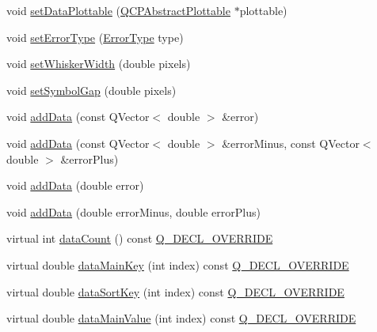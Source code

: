 \begin{DoxyCompactItemize}
\item 
void \mbox{\hyperlink{class_q_c_p_error_bars_aabb42a964cfbf780cd1c79850c7cd989}{set\+Data\+Plottable}} (\mbox{\hyperlink{class_q_c_p_abstract_plottable}{Q\+C\+P\+Abstract\+Plottable}} $\ast$plottable)
\item 
void \mbox{\hyperlink{class_q_c_p_error_bars_af0af493d454a8f3a0908830160680d2b}{set\+Error\+Type}} (\mbox{\hyperlink{class_q_c_p_error_bars_a95f0220f11a72648b96480a85ce26474}{Error\+Type}} type)
\item 
void \mbox{\hyperlink{class_q_c_p_error_bars_ad05f6ff9e46c6047f1cd2459744b7b59}{set\+Whisker\+Width}} (double pixels)
\item 
void \mbox{\hyperlink{class_q_c_p_error_bars_a280ee8d863d8a2630c309701d019b3de}{set\+Symbol\+Gap}} (double pixels)
\item 
void \mbox{\hyperlink{class_q_c_p_error_bars_aae296ad9817b3fa418db284af81cecf8}{add\+Data}} (const Q\+Vector$<$ double $>$ \&error)
\item 
void \mbox{\hyperlink{class_q_c_p_error_bars_a2135cf41d7925a3dcdadd4eb03fd3eb6}{add\+Data}} (const Q\+Vector$<$ double $>$ \&error\+Minus, const Q\+Vector$<$ double $>$ \&error\+Plus)
\item 
void \mbox{\hyperlink{class_q_c_p_error_bars_a39ef73b0e61941fc4064fd3a5224c72a}{add\+Data}} (double error)
\item 
void \mbox{\hyperlink{class_q_c_p_error_bars_a1833c5de9c2fe2952b977505d9f27cd1}{add\+Data}} (double error\+Minus, double error\+Plus)
\item 
virtual int \mbox{\hyperlink{class_q_c_p_error_bars_a18b797c62f2af000b926e52eb46d97c7}{data\+Count}} () const \mbox{\hyperlink{qcustomplot_8h_a42cc5eaeb25b85f8b52d2a4b94c56f55}{Q\+\_\+\+D\+E\+C\+L\+\_\+\+O\+V\+E\+R\+R\+I\+DE}}
\item 
virtual double \mbox{\hyperlink{class_q_c_p_error_bars_a7cba420078adc523efa59fb8c6ca23e0}{data\+Main\+Key}} (int index) const \mbox{\hyperlink{qcustomplot_8h_a42cc5eaeb25b85f8b52d2a4b94c56f55}{Q\+\_\+\+D\+E\+C\+L\+\_\+\+O\+V\+E\+R\+R\+I\+DE}}
\item 
virtual double \mbox{\hyperlink{class_q_c_p_error_bars_a3000a036124880a90c629d124c1cd1e2}{data\+Sort\+Key}} (int index) const \mbox{\hyperlink{qcustomplot_8h_a42cc5eaeb25b85f8b52d2a4b94c56f55}{Q\+\_\+\+D\+E\+C\+L\+\_\+\+O\+V\+E\+R\+R\+I\+DE}}
\item 
virtual double \mbox{\hyperlink{class_q_c_p_error_bars_ae9f6c79c03147efb1a67742c55386dc8}{data\+Main\+Value}} (int index) const \mbox{\hyperlink{qcustomplot_8h_a42cc5eaeb25b85f8b52d2a4b94c56f55}{Q\+\_\+\+D\+E\+C\+L\+\_\+\+O\+V\+E\+R\+R\+I\+DE}}

\end{DoxyCompactItemize}
